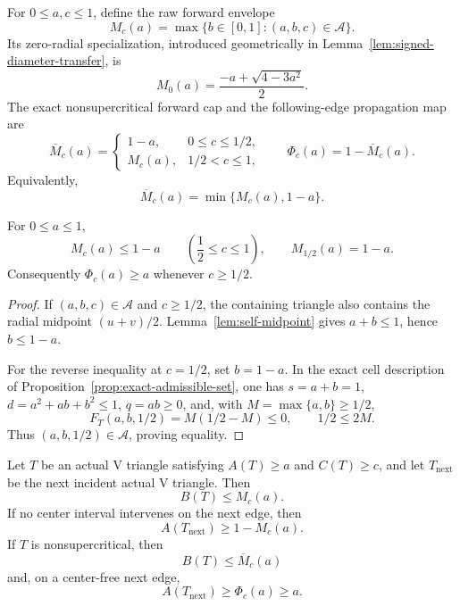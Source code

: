 For $0\le a,c\le1$, define the raw forward envelope
\begin{equation}
M_c(a)=\max\{b\in[0,1]:(a,b,c)\in\mathcal A\}.
\label{eq:reader-raw-capped-maps}
\end{equation}
Its zero-radial specialization, introduced geometrically in
Lemma~\ref{lem:signed-diameter-transfer}, is
\begin{equation}
 M_0(a)=\frac{-a+\sqrt{4-3a^2}}2.
 \label{eq:reader-zero-radial-envelope}
\end{equation}
The exact nonsupercritical forward cap and the following-edge propagation map
are
\begin{equation}
 \overline M_c(a)=
 \begin{cases}
 1-a,&0\le c\le1/2,\\
 M_c(a),&1/2<c\le1,
 \end{cases}
 \qquad
 \Phi_c(a)=1-\overline M_c(a).
 \label{eq:reader-technical-aliases}
\end{equation}
Equivalently,
\[
 \overline M_c(a)=\min\{M_c(a),1-a\}.
\]
\begin{lemma}
\label{lem:reader-midpoint-threshold}
For $0\le a\le1$,
\[
 M_c(a)\le1-a\qquad\left(\frac12\le c\le1\right),
 \qquad
 M_{1/2}(a)=1-a.
\]
Consequently $\Phi_c(a)\ge a$ whenever $c\ge1/2$.
\end{lemma}

\begin{proof}
If $(a,b,c)\in\mathcal A$ and $c\ge1/2$, the containing triangle also
contains the radial midpoint $(u+v)/2$.  Lemma~\ref{lem:self-midpoint} gives
$a+b\le1$, hence $b\le1-a$.

For the reverse inequality at $c=1/2$, set $b=1-a$.  In the exact cell
description of Proposition~\ref{prop:exact-admissible-set}, one has
$s=a+b=1$, $d=a^2+ab+b^2\le1$, $q=ab\ge0$, and, with
$M=\max\{a,b\}\ge1/2$,
\[
 F_T(a,b,1/2)=M(1/2-M)\le0,
 \qquad
 1/2\le2M.
\]
Thus $(a,b,1/2)\in\mathcal A$, proving equality.
\end{proof}

\begin{lemma}
\label{lem:reader-raw-capped-transfer}
Let $T$ be an actual V triangle satisfying
$A(T)\ge a$ and $C(T)\ge c$, and let $T_{\mathrm{next}}$ be the next
incident actual V triangle. Then
\[
 B(T)\le M_c(a).
\]
If no center interval intervenes on the next edge, then
\[
 A(T_{\mathrm{next}})\ge1-M_c(a).
\]
If $T$ is nonsupercritical, then
\begin{equation}
 B(T)\le\overline M_c(a)
 \label{eq:reader-branchwise-outgoing}
\end{equation}
and, on a center-free next edge,
\begin{equation}
 A(T_{\mathrm{next}})\ge\Phi_c(a)\ge a.
 \label{eq:reader-branchwise-transfer}
\end{equation}
\end{lemma}


